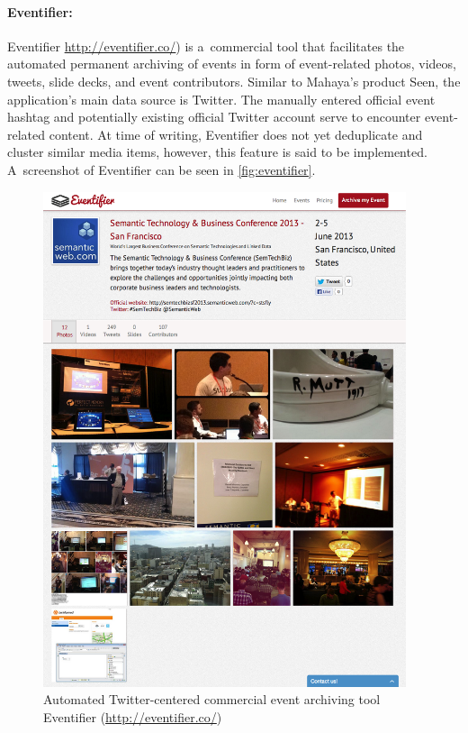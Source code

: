 \paragraph{Eventifier:}

Eventifier \url{http://eventifier.co/}) is a~commercial tool
that facilitates the automated permanent archiving of events
in form of event-related photos, videos, tweets, slide decks,
and event contributors.
Similar to Mahaya's product Seen,
the application's main data source is Twitter.
The manually entered official event hashtag and potentially existing
official Twitter account serve to encounter event-related content.
At time of writing, Eventifier does not yet
deduplicate and cluster similar media items,
however, this feature is said to be implemented.
A~screenshot of Eventifier can be seen in \autoref{fig:eventifier}.

\begin{figure}
  \centering
  \includegraphics[width=0.95\textwidth,height=0.9\textheight,keepaspectratio]{eventifier.png}
  \caption[Automated commercial event archiving tool Eventifier]{Automated Twitter-centered commercial event archiving tool Eventifier
    (\url{http://eventifier.co/})}
  \label{fig:eventifier}
\end{figure}

